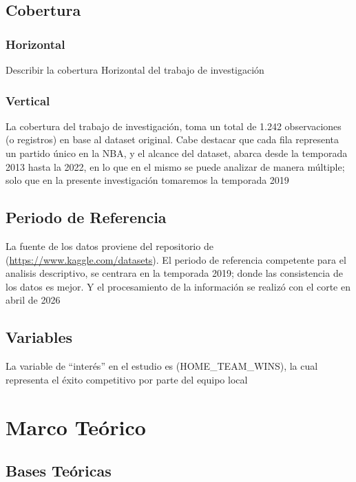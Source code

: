 \documentclass[oneside,11pt]{Latex/Classes/PhDthesisPSnPDF}
\begin{document}
\section{Cobertura}

\subsection{Horizontal}

Describir la cobertura Horizontal del trabajo de investigación\\

\subsection{Vertical}

La cobertura del trabajo de investigación, toma un total de 1.242
observaciones (o registros) en base al dataset original. Cabe destacar
que cada fila representa un partido único en la NBA, y el alcance del
dataset, abarca desde la temporada 2013 hasta la 2022, en lo que en el
mismo se puede analizar de manera múltiple; solo que en la presente
investigación tomaremos la temporada 2019

\section{Periodo de Referencia}

La fuente de los datos proviene del repositorio de
(\url{https://www.kaggle.com/datasets}). El periodo de referencia
competente para el analisis descriptivo, se centrara en la temporada
2019; donde las consistencia de los datos es mejor. Y el procesamiento
de la información se realizó con el corte en abril de 2026

\section{Variables}

La variable de ``interés'' en el estudio es (HOME\_TEAM\_WINS), la cual
representa el éxito competitivo por parte del equipo local

\chapter{Marco Teórico}

\section{Bases Teóricas}
\end{document}
